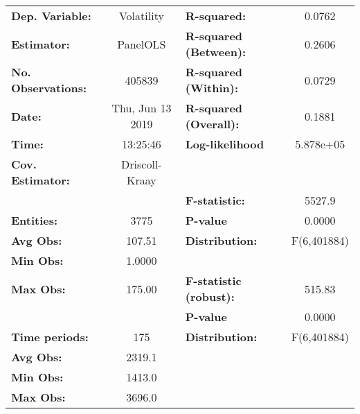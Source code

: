 \begin{center}
\begin{tabular}{lclc}
\toprule
\textbf{Dep. Variable:}                 &     Volatility     & \textbf{  R-squared:         }   &      0.0762      \\
\textbf{Estimator:}                     &      PanelOLS      & \textbf{  R-squared (Between):}  &      0.2606      \\
\textbf{No. Observations:}              &       405839       & \textbf{  R-squared (Within):}   &      0.0729      \\
\textbf{Date:}                          &  Thu, Jun 13 2019  & \textbf{  R-squared (Overall):}  &      0.1881      \\
\textbf{Time:}                          &      13:25:46      & \textbf{  Log-likelihood     }   &    5.878e+05     \\
\textbf{Cov. Estimator:}                &   Driscoll-Kraay   & \textbf{                     }   &                  \\
\textbf{}                               &                    & \textbf{  F-statistic:       }   &      5527.9      \\
\textbf{Entities:}                      &        3775        & \textbf{  P-value            }   &      0.0000      \\
\textbf{Avg Obs:}                       &       107.51       & \textbf{  Distribution:      }   &   F(6,401884)    \\
\textbf{Min Obs:}                       &       1.0000       & \textbf{                     }   &                  \\
\textbf{Max Obs:}                       &       175.00       & \textbf{  F-statistic (robust):} &      515.83      \\
\textbf{}                               &                    & \textbf{  P-value            }   &      0.0000      \\
\textbf{Time periods:}                  &        175         & \textbf{  Distribution:      }   &   F(6,401884)    \\
\textbf{Avg Obs:}                       &       2319.1       & \textbf{                     }   &                  \\
\textbf{Min Obs:}                       &       1413.0       & \textbf{                     }   &                  \\
\textbf{Max Obs:}                       &       3696.0       & \textbf{                     }   &                  \\

\end{tabular}
\end{center}
